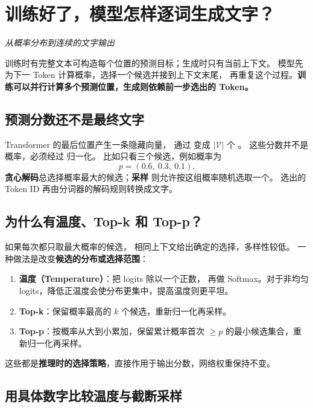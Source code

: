 \chapterrule
\section{训练好了，模型怎样逐词生成文字？}
\label{intro:23-llm-systems}

\begin{idea}
\noindent\emph{从概率分布到连续的文字输出}\par

训练时有完整文本可构造每个位置的预测目标；生成时只有当前上下文。
模型先为下一 Token 计算概率，选择一个候选并接到上下文末尾，
再重复这个过程。\textbf{训练可以并行计算多个预测位置，生成则依赖前一步选出的 Token。}
\end{idea}

\subsection{预测分数还不是最终文字}

Transformer 的最后位置产生一条隐藏向量，
通过  变成 $|\mathcal V|$ 个 。
这些分数并不是概率，必须经过  归一化。
比如只看三个候选，例如概率为
\[
p=(0.6,\ 0.3,\ 0.1).
\]
\textbf{贪心解码}总选择概率最大的候选；\textbf{采样}
则允许按这组概率随机选取一个。
选出的 Token ID 再由分词器的解码规则转换成文字。

\subsection{为什么有温度、Top-k 和 Top-p？}
\label{concept:sampling}

如果每次都只取最大概率的候选，
相同上下文给出确定的选择，多样性较低。
一种做法是改变\textbf{候选的分布或选择范围}：
\begin{enumerate}
\item \textbf{温度（Temperature）}：把 logits 除以一个正数，
再做 Softmax。对于非均匀 logits，降低正温度会使分布更集中，提高温度则更平坦。
\item \textbf{Top-k}：保留概率最高的 $k$ 个候选，重新归一化再采样。
\item \textbf{Top-p}：按概率从大到小累加，保留累计概率首次 $\ge p$ 的最小候选集合，重新归一化再采样。
\end{enumerate}
这些都是\textbf{推理时的选择策略}，直接作用于输出分数，网络权重保持不变。

\subsection{用具体数字比较温度与截断采样}

